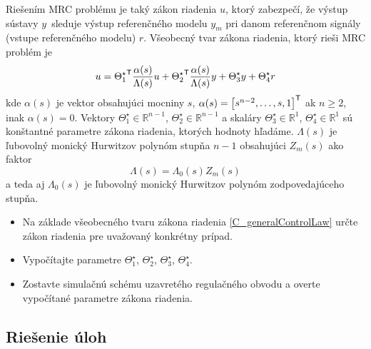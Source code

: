 \documentclass[a4paper, 10pt, ]{article}
\begin{document}
\begin{enumerate}[leftmargin=0pt, labelsep=4mm, itemsep=0pt]
    Riešením MRC problému je taký zákon riadenia $u$, ktorý zabezpečí, že výstup sústavy $y$~sleduje výstup referenčného modelu $y_m$ pri danom referenčnom signály (vstupe referenčného modelu) $r$. Všeobecný tvar zákona riadenia, ktorý rieši MRC problém je
    \begin{equation} \label{C_generalControlLaw}
    	u = {\Theta_1^\star}^{\mathsf{T}} \frac{\alpha(s)}{\Lambda(s)} u + {\Theta_2^\star}^{\mathsf{T}} \frac{\alpha(s)}{\Lambda(s)} y + \Theta_3^\star y + \Theta_4^\star r
    \end{equation}
    kde $\alpha(s)$ je vektor obsahujúci mocniny $s$, $\alpha(s) = \begin{bmatrix} s^{n-2}, \ldots,s, 1 \end{bmatrix}^{\mathsf{T}}$ ak $n\geq 2$, inak $\alpha(s) = 0$. Vektory $\Theta_1^\star \in \mathbb{R}^{n-1}$, $\Theta_2^\star \in \mathbb{R}^{n-1}$ a skaláry $\Theta_3^\star \in \mathbb{R}^1$, $\Theta_4^\star \in \mathbb{R}^1$ sú konštantné parametre zákona riadenia, ktorých hodnoty hľadáme.  $\Lambda(s)$ je ľubovolný monický Hurwitzov polynóm stupňa $n-1$ obsahujúci $Z_m(s)$ ako faktor
    \begin{equation}
    	\Lambda(s) = \Lambda_0(s) Z_m(s)
    \end{equation}
    a teda aj $\Lambda_0(s)$ je ľubovolný monický Hurwitzov polynóm zodpovedajúceho stupňa.


    \begin{itemize}[leftmargin=0pt, labelsep=4mm, itemsep=0pt]
    	\item Na základe všeobecného tvaru zákona riadenia \eqref{C_generalControlLaw} určte zákon riadenia pre uvažovaný konkrétny prípad.
    	\item Vypočítajte parametre $\Theta_1^\star$, $\Theta_2^\star$, $\Theta_3^\star$, $\Theta_4^\star$.
    	\item Zostavte simulačnú schému uzavretého regulačného obvodu a overte vypočítané parametre zákona riadenia.
    \end{itemize}





\end{enumerate}















\subsection{Riešenie úloh}
\end{document}
